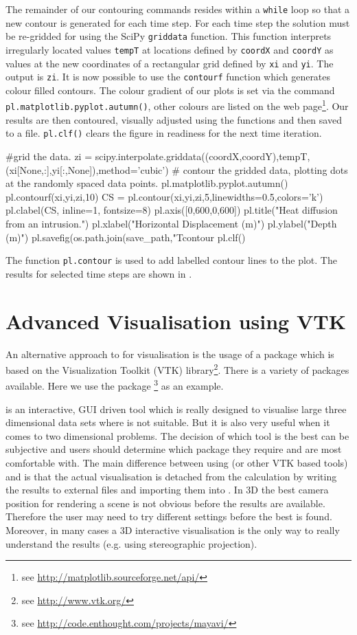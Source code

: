 The remainder of our contouring commands resides within a \verb|while| loop so
that a new contour is generated for each time step. For each time step the
solution must be re-gridded for \modmpl using the SciPy \verb|griddata| function. This
function interprets irregularly located values \verb|tempT| at locations defined
by \verb|coordX| and \verb|coordY| as values at the new coordinates of a
rectangular grid defined by
\verb|xi| and \verb|yi|. The output is \verb|zi|. It is now possible to use the
\verb|contourf| function which generates colour filled contours. The colour
gradient of our plots is set via the command 
\verb|pl.matplotlib.pyplot.autumn()|, other colours are listed on the \modmpl web page\footnote{see
\url{http://matplotlib.sourceforge.net/api/}}. Our results are then contoured,
visually adjusted using the \modmpl functions and then saved to a file.
\verb|pl.clf()| clears the figure in readiness for the next time iteration.
\begin{python}
#grid the data.
zi = scipy.interpolate.griddata((coordX,coordY),tempT,(xi[None,:],yi[:,None]),method='cubic')
# contour the gridded data, plotting dots at the randomly spaced data points.
pl.matplotlib.pyplot.autumn()
pl.contourf(xi,yi,zi,10)
CS = pl.contour(xi,yi,zi,5,linewidths=0.5,colors='k')
pl.clabel(CS, inline=1, fontsize=8)
pl.axis([0,600,0,600])
pl.title("Heat diffusion from an intrusion.")
pl.xlabel("Horizontal Displacement (m)")
pl.ylabel("Depth (m)")
pl.savefig(os.path.join(save_path,"Tcontour%
pl.clf()        
\end{python}
The function \verb|pl.contour| is used to add labelled contour lines to the
plot. 
The results for selected time steps are shown in .


\section{Advanced Visualisation using VTK}

An alternative approach to \modmpl for visualisation is the usage of a package
which is based on the Visualization Toolkit (VTK) library\footnote{see \url{http://www.vtk.org/}}.
There is a variety of packages available. Here we use the package \mayavi\footnote{see
\url{http://code.enthought.com/projects/mayavi/}} as an example. 

\mayavi is an interactive, GUI driven tool which is 
really designed to visualise large three dimensional data sets where \modmpl 
is not suitable. But it is also very useful when it comes to two dimensional
problems. 
The decision of which tool is the best can be subjective and users should
determine which package they require and are most comfortable with. The main
difference between using \mayavi (or other VTK based tools) and \modmpl is that
the actual visualisation is detached from the calculation by writing the
results to external files and importing them into \mayavi. In 3D the best
camera position for rendering a scene is not obvious before the results are
available. Therefore the user may need to try different settings before the
best is found. Moreover, in many cases a 3D interactive visualisation is the
only way to really understand the results (e.g. using stereographic projection).

